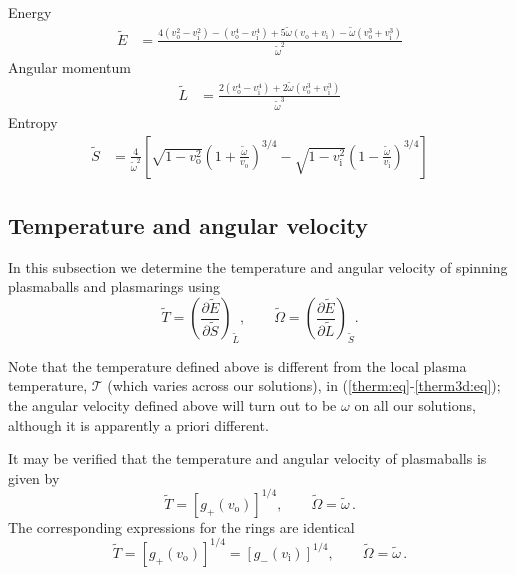 \documentclass[12pt,a4paper]{article}
\newcommand{\prn}[1]{\left ( #1 \right )}
\newcommand{\brk}[1]{\left [ #1 \right ]}
\newcommand{\pdiffc}[3][\rule{0mm}{0mm}]{\left (\frac{\partial #2}{\partial {#3}}\right )_{\!\!#1}}
\newcommand{\tE}{\widetilde{E}}
\newcommand{\tL}{\widetilde{L}}
\newcommand{\tS}{\widetilde{S}}
\newcommand{\tT}{\widetilde{T}}
\newcommand{\tO}{\widetilde{\Omega}}
\newcommand{\tloc}{\mathcal{T}}
\newcommand{\vi}{v_\mathrm{i}}
\newcommand{\vo}{v_\mathrm{o}}
\newcommand{\z}{\tilde{r}}
\newcommand{\zi}{\z_\mathrm{i}}
\newcommand{\zo}{\z_\mathrm{o}}
\newcommand{\tw}{\widetilde{\omega}}
\begin{document}
Energy
%
\begin{equation}\label{ringE:eq}
\begin{split}
    \tE &= \frac{4(\vo^2-\vi^2) - (\vo^4-\vi^4)
                 + 5\tw (\vo+\vi) - \tw (\vo^3+\vi^3)}
             {\tw^2}
\end{split}
\end{equation}
%
Angular momentum
%
\begin{equation}\label{ringL:eq}
\begin{split}
  \tL &= \frac{2(\vo^4-\vi^4)+2\tw (\vo^3+\vi^3)}{\tw^3}
\end{split}
\end{equation}
%
Entropy
%
\begin{equation}\label{ringS:eq}
\begin{split}
  \tS &= \frac{4}{\tw^2}
        \brk{\sqrt{1-\vo^2}\prn{1+\frac{\tw}{\vo}}^{3/4}
            -\sqrt{1-\vi^2}\prn{1-\frac{\tw}{\vi}}^{3/4}}
\end{split}
\end{equation}
%


\subsection{Temperature and angular velocity}\label{sec:temp}

In this subsection we determine the temperature and angular velocity
of spinning plasmaballs and plasmarings using
%
\begin{equation}\label{tempdef:eq}
  \tT = \pdiffc[\tL]{\tE}{\tS}, \qquad   \tO = \pdiffc[\tS]{\tE}{\tL}.
\end{equation}


%
Note that the temperature defined above is different from the local
plasma temperature, $\tloc$ (which varies across our solutions), in
(\ref{therm:eq}-\ref{therm3d:eq}); the angular velocity defined
above will turn out to be $\omega$ on all our solutions, although it
is apparently a priori different.

It may be verified that the temperature and angular velocity of
plasmaballs is given by
%
\begin{equation}\label{temp:eq}
  \tT = [g_+(\vo)]^{1/4}, \qquad \tO = \tw\,.
\end{equation}
%
The corresponding expressions  for the rings are identical
%
\begin{equation}\label{temp2:eq}
  \tT = [g_+(\vo)]^{1/4} = [g_-(\vi)]^{1/4}, \qquad \tO = \tw\,.
\end{equation}
%
\end{document}
